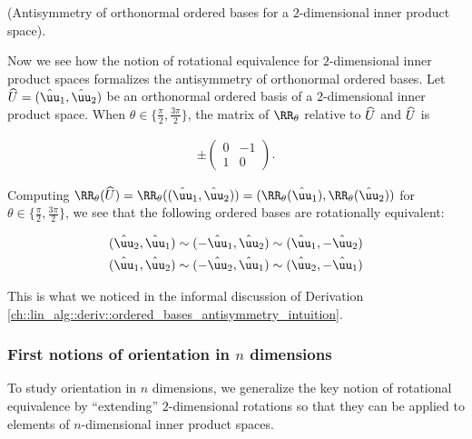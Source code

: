 \begin{theorem}
    \label{ch::lin_alg::thm::antisymmetry_ordered_bases_2_dimensions}

    (Antisymmetry of orthonormal ordered bases for a $2$-dimensional inner product space).
    
    Now we see how the notion of rotational equivalence for $2$-dimensional inner product spaces formalizes the antisymmetry of orthonormal ordered bases. Let $\hU = (\huu_1, \huu_2)$ be an orthonormal ordered basis of a $2$-dimensional inner product space. When $\theta \in \{\frac{\pi}{2}, \frac{3\pi}{2} \}$, the matrix of $\RR_\theta$ relative to $\widehat{U}$ and $\widehat{U}$ is
    
    \begin{align*}
        \pm
        \begin{pmatrix}
            0 & -1 \\
            1 & 0
        \end{pmatrix}.
    \end{align*}
    
    Computing $\RR_\theta(\hU) = \RR_\theta((\huu_1, \huu_2)) = (\RR_\theta(\huu_1), \RR_\theta(\huu_2))$ for $\theta \in \{\frac{\pi}{2}, \frac{3\pi}{2}\}$, we see that the following ordered bases are rotationally equivalent:
    
    \begin{align*}
        (\huu_2, \huu_1 ) &\sim (-\huu_1, \huu_2) \sim (\huu_1, - \huu_2) \\
        (\huu_1, \huu_2) &\sim (-\huu_2, \huu_1) \sim (\huu_2, -\huu_1)
    \end{align*}

    This is what we noticed in the informal discussion of Derivation \ref{ch::lin_alg::deriv::ordered_bases_antisymmetry_intuition}.
\end{theorem}

\subsubsection*{First notions of orientation in $n$ dimensions}

To study orientation in $n$ dimensions, we generalize the key notion of rotational equivalence by ``extending'' $2$-dimensional rotations so that they can be applied to elements of $n$-dimensional inner product spaces. 

